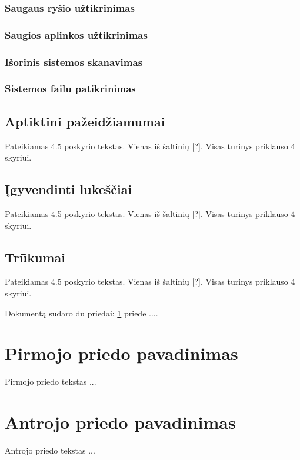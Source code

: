 \documentclass[a4paper,12pt,fleqn]{article}
\begin{document}
\subsubsection{Saugaus ryšio užtikrinimas}

\subsubsection{Saugios aplinkos užtikrinimas}

\subsubsection{Išorinis sistemos skanavimas}

\subsubsection{Sistemos failu patikrinimas}

\subsection{Aptiktini pažeidžiamumai}
\label{sec:example}

Pateikiamas 4.5 poskyrio tekstas. Vienas iš šaltinių [?]. Visas turinys priklauso 4 skyriui.

\subsection{Įgyvendinti lukeščiai}
\label{sec:example}

Pateikiamas 4.5 poskyrio tekstas. Vienas iš šaltinių [?]. Visas turinys priklauso 4 skyriui.

\subsection{Trūkumai}
\label{sec:example}

Pateikiamas 4.5 poskyrio tekstas. Vienas iš šaltinių [?]. Visas turinys priklauso 4 skyriui.





%

\newpage
\begin{appendices}
Dokumentą sudaro du priedai: \ref{app:a} priede  ....
\newpage
\section{Pirmojo priedo pavadinimas}
\label{app:a}
Pirmojo priedo tekstas ...

\newpage
\section{Antrojo priedo pavadinimas}
Antrojo priedo tekstas ...

\end{appendices}
\end{document}

